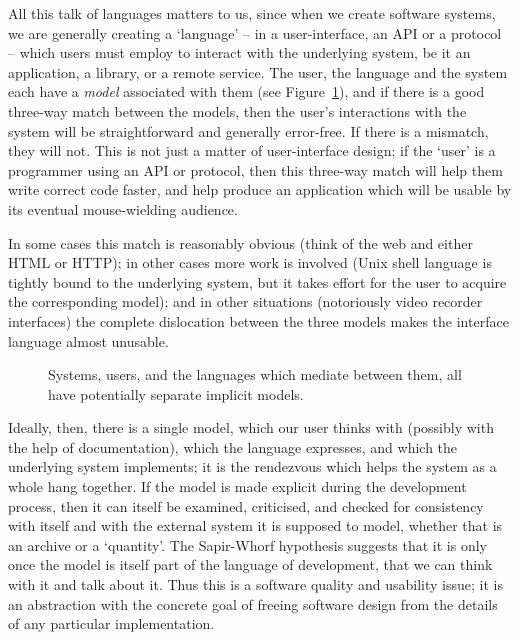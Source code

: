 \documentclass[11pt,twoside]{article}
\begin{document}
All this talk of languages matters to us, since when we create
software systems, we are generally creating a `language' -- in a
user-interface, an API or a protocol -- which users must employ to
interact with the underlying system, be it an application, a library,
or a remote service.  The user, the language and the system each
have a \emph{model} associated with them (see Figure~\ref{f:models}), and
if there is a good three-way match between the models,
then the user's interactions with the
system will be straightforward and generally error-free.  If there is
a mismatch, they will not.  This is not just a matter of
user-interface design; if the `user' is a programmer using an
API or protocol, then this three-way match will help them write
correct code faster, and help produce an application which will be
usable by its eventual mouse-wielding audience.

In some cases this match is reasonably obvious (think of the web and
either HTML or HTTP); in other cases more work is involved (Unix shell
language is tightly bound to the underlying system, but it takes
effort for the user to acquire the corresponding model); and in other
situations (notoriously video recorder interfaces) the complete
dislocation between the three models makes the interface language
almost unusable.

\begin{figure}
\caption{\label{f:models}Systems, users, and the languages which
mediate between them, all have potentially separate implicit models.}
\end{figure}

Ideally, then, there is a single model, which our user thinks with
(possibly with the help of documentation), which the language
expresses, and which the underlying system implements; it is the
rendezvous which helps the system as a whole hang together.  If the
model is made explicit during the development process, then it can
itself be examined, criticised, and checked for consistency with
itself and with the external system it is supposed to model, whether
that is an archive or a `quantity'.  The Sapir-Whorf hypothesis
suggests that it is only once the model is itself part of the language
of development, that we can think with it and talk about it.  Thus
this is a software quality and usability issue; it is an abstraction
with the concrete goal of freeing software design from the details of
any particular implementation.
\end{document}
